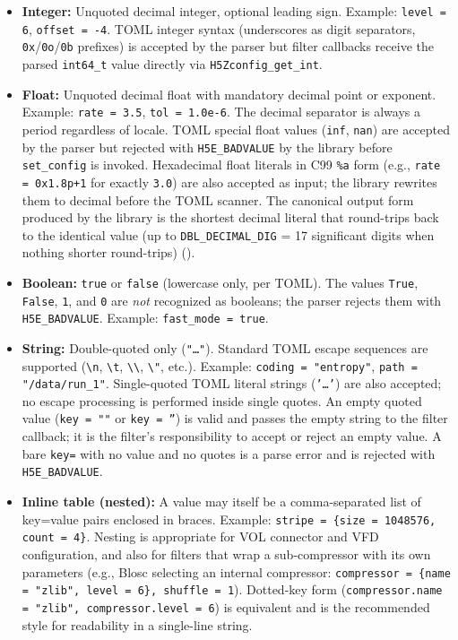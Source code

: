 \documentclass[../RFC-HDFG-2026-001.tex]{subfiles}
\begin{document}
\begin{itemize}
\item \textbf{Integer:} Unquoted decimal integer, optional leading sign.
  Example: \texttt{level = 6}, \texttt{offset = -4}.
  TOML integer syntax (underscores as digit separators, \texttt{0x}/\texttt{0o}/\texttt{0b}
  prefixes) is accepted by the parser but filter callbacks receive the
  parsed \texttt{int64\_t} value directly via \texttt{H5Zconfig\_get\_int}.
\item \textbf{Float:} Unquoted decimal float with mandatory decimal point or
  exponent. Example: \texttt{rate = 3.5}, \texttt{tol = 1.0e-6}.
  The decimal separator is always a period regardless of locale.
  TOML special float values (\texttt{inf}, \texttt{nan}) are accepted by the
  parser but rejected with \texttt{H5E\_BADVALUE} by the library before
  \texttt{set\_config} is invoked.
  Hexadecimal float literals in C99 \texttt{\%a} form
  (e.g., \texttt{rate = 0x1.8p+1} for exactly \texttt{3.0}) are also accepted
  as input; the library rewrites them to decimal before the TOML scanner.
  The canonical output form produced by the library is the shortest decimal
  literal that round-trips back to the identical value (up to
  \texttt{DBL\_DECIMAL\_DIG} = 17 significant digits when nothing shorter
  round-trips) ().
\item \textbf{Boolean:} \texttt{true} or \texttt{false} (lowercase only, per
  TOML).  The values \texttt{True}, \texttt{False}, \texttt{1}, and \texttt{0}
  are \emph{not} recognized as booleans; the parser rejects them with
  \texttt{H5E\_BADVALUE}.  Example: \texttt{fast\_mode = true}.
\item \textbf{String:} Double-quoted only (\texttt{"\ldots"}).  Standard TOML
  escape sequences are supported (\texttt{\textbackslash n}, \texttt{\textbackslash t},
  \texttt{\textbackslash\textbackslash}, \texttt{\textbackslash"}, etc.).
  Example: \texttt{coding = "entropy"}, \texttt{path = "/data/run\_1"}.
  Single-quoted TOML literal strings (\texttt{'\ldots'}) are also accepted;
  no escape processing is performed inside single quotes.
  An empty quoted value (\texttt{key = ""} or \texttt{key = ''}) is valid
  and passes the empty string to the filter callback; it is the filter's
  responsibility to accept or reject an empty value.
  A bare \texttt{key=} with no value and no quotes is a parse error and is
  rejected with \texttt{H5E\_BADVALUE}.
\item \textbf{Inline table (nested):} A value may itself be a
  comma-separated list of key=value pairs enclosed in braces.
  Example: \texttt{stripe = \{size = 1048576, count = 4\}}.
  Nesting is appropriate for VOL connector and VFD configuration, and
  also for filters that wrap a sub-compressor with its own parameters
  (e.g., Blosc selecting an internal compressor:
  \texttt{compressor = \{name = "zlib", level = 6\}, shuffle = 1}).
  Dotted-key form (\texttt{compressor.name = "zlib", compressor.level = 6})
  is equivalent and is the recommended style for readability in a
  single-line string.
\end{itemize}
\end{document}
